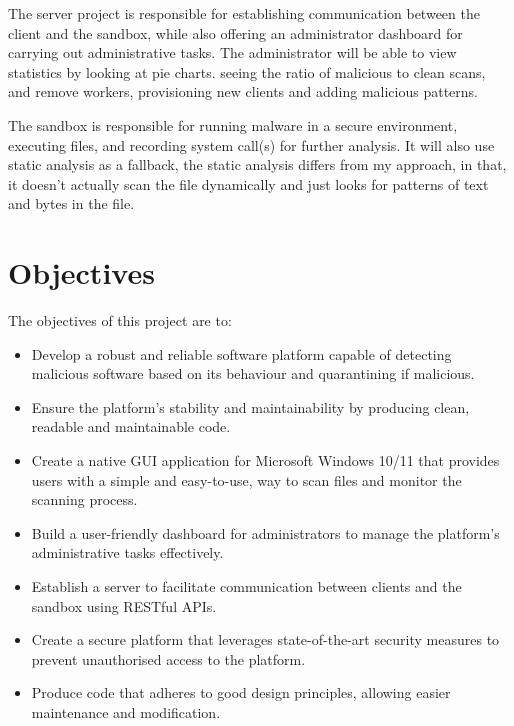 The server project is responsible for establishing communication
between the client and the sandbox,
while also offering an administrator dashboard
for carrying out administrative tasks.
The administrator will be able to view statistics by looking at pie charts.
seeing the ratio of malicious to clean scans,
and remove workers, provisioning new clients and adding malicious patterns.

The sandbox is responsible for running malware in a secure environment,
executing files, and recording system call(s) for further analysis.
It will also use static analysis as a fallback,
the static analysis differs from my approach,
in that, it doesn't actually scan the file dynamically
and just looks for patterns of text and bytes in the file.


\section{Objectives}
The objectives of this project are to:
\begin{itemize}
\item Develop a robust and reliable software platform capable of detecting
      malicious software based on its behaviour and quarantining if malicious.
\item Ensure the platform's stability and maintainability by producing clean,
      readable and maintainable code.
\item Create a native GUI application for Microsoft Windows 10/11
      that provides users with a simple and easy-to-use,
      way to scan files and monitor the scanning process.
\item Build a user-friendly dashboard for administrators to manage
      the platform's administrative tasks effectively.
\item Establish a server to facilitate communication between
      clients and the sandbox using RESTful APIs.
\item Create a secure platform that leverages state-of-the-art security
      measures to prevent unauthorised access to the platform.
\item Produce code that adheres to good design principles,
      allowing easier maintenance and modification.
\end{itemize}


